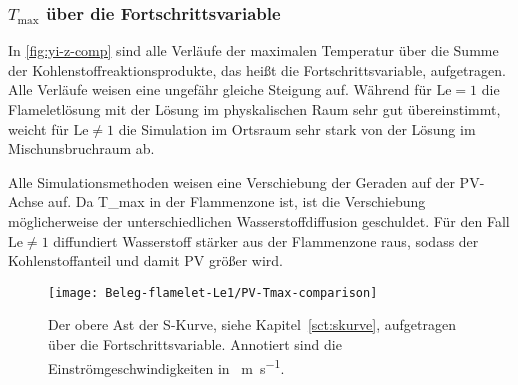 \subsubsection{\texorpdfstring{$T_\mathrm{max}$}{Tmax} über die Fortschrittsvariable}
\label{sct:cmp-Tmax-PV}

In \autoref{fig:yi-z-comp} sind alle Verläufe der maximalen Temperatur über die Summe der Kohlenstoffreaktionsprodukte, das heißt die Fortschrittsvariable, aufgetragen. Alle Verläufe weisen eine ungefähr gleiche Steigung auf.
Während für $\mathrm{Le}=1$ die Flameletlösung mit der Lösung im physkalischen Raum sehr gut übereinstimmt, weicht für  $\mathrm{Le}\neq 1$ die Simulation im Ortsraum sehr stark von der Lösung im Mischunsbruchraum ab.

Alle Simulationsmethoden weisen eine Verschiebung der Geraden auf der $\mathrm{PV}$-Achse auf. Da \gls{T_max} in der Flammenzone ist, ist die Verschiebung möglicherweise der unterschiedlichen Wasserstoffdiffusion geschuldet. Für den Fall $\mathrm{Le}\neq 1$ diffundiert Wasserstoff stärker aus der Flammenzone raus, sodass der Kohlenstoffanteil und damit $\mathrm{PV}$ größer wird.

\begin{figure}[H]
    \begin{center}\begin{minipage}{0.6\linewidth}
        \texttt{[image: Beleg-flamelet-Le1/PV-Tmax-comparison]}
    \end{minipage}\end{center}
    \caption{Der obere Ast der S-Kurve, siehe Kapitel~\ref{sct:skurve}, aufgetragen über die Fortschrittsvariable. Annotiert sind die Einströmgeschwindigkeiten in \SI{}{\meter\per\second}.}
    \label{fig:yi-z-comp}
\end{figure}


